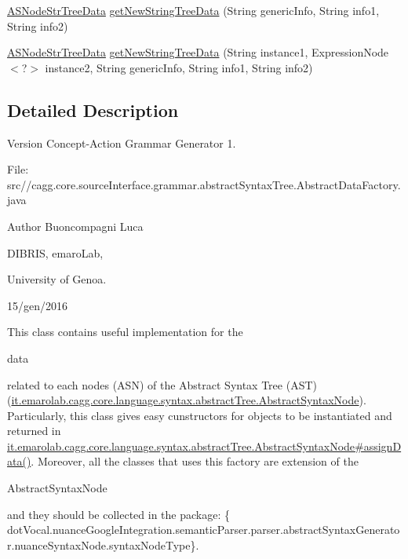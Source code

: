\begin{DoxyCompactItemize}
\item 
\hyperlink{classit_1_1emarolab_1_1cagg_1_1core_1_1language_1_1syntax_1_1abstractTree_1_1AbstractDataFactory_1_1ASNodeStrTreeData}{A\-S\-Node\-Str\-Tree\-Data} \hyperlink{classit_1_1emarolab_1_1cagg_1_1core_1_1language_1_1syntax_1_1abstractTree_1_1AbstractDataFactory_a1ce3409d1208d1caa74be53f597ceda3}{get\-New\-String\-Tree\-Data} (String generic\-Info, String info1, String info2)
\item 
\hyperlink{classit_1_1emarolab_1_1cagg_1_1core_1_1language_1_1syntax_1_1abstractTree_1_1AbstractDataFactory_1_1ASNodeStrTreeData}{A\-S\-Node\-Str\-Tree\-Data} \hyperlink{classit_1_1emarolab_1_1cagg_1_1core_1_1language_1_1syntax_1_1abstractTree_1_1AbstractDataFactory_a5e26776b7088c249759cc1097a8fa20b}{get\-New\-String\-Tree\-Data} (String instance1, Expression\-Node$<$?$>$ instance2, String generic\-Info, String info1, String info2)
\end{DoxyCompactItemize}


\subsection{Detailed Description}
\begin{DoxyVersion}{Version}
Concept-\/\-Action Grammar Generator 1. \par
 File\-: src//cagg.core.\-source\-Interface.\-grammar.\-abstract\-Syntax\-Tree.\-Abstract\-Data\-Factory.\-java \par

\end{DoxyVersion}
\begin{DoxyAuthor}{Author}
Buoncompagni Luca \par
 D\-I\-B\-R\-I\-S, emaro\-Lab,\par
 University of Genoa. \par
 15/gen/2016 \par

\end{DoxyAuthor}


This class contains useful implementation for the
\begin{DoxyCode}
data 
\end{DoxyCode}
 related to each nodes (A\-S\-N) of the Abstract Syntax Tree (A\-S\-T) (\hyperlink{}{it.\-emarolab.\-cagg.\-core.\-language.\-syntax.\-abstract\-Tree.\-Abstract\-Syntax\-Node}). Particularly, this class gives easy cunstructors for objects to be instantiated and returned in \hyperlink{}{it.\-emarolab.\-cagg.\-core.\-language.\-syntax.\-abstract\-Tree.\-Abstract\-Syntax\-Node\#assign\-Data()}. Moreover, all the classes that uses this factory are extension of the
\begin{DoxyCode}
AbstractSyntaxNode 
\end{DoxyCode}
 and they should be collected in the package\-: \{ dot\-Vocal.\-nuance\-Google\-Integration.\-semantic\-Parser.\-parser.\-abstract\-Syntax\-Generator.\-nuance\-Syntax\-Node.\-syntax\-Node\-Type\}.\par


